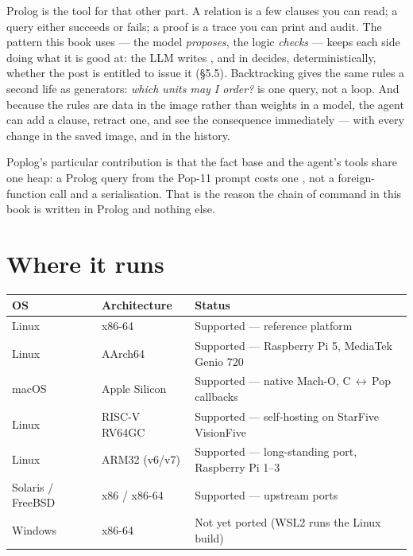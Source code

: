 Prolog is the tool for that other part. A relation is a few clauses you can
read; a query either succeeds or fails; a proof is a trace you can print and
audit. The pattern this book uses --- the model \emph{proposes}, the logic
\emph{checks} --- keeps each side doing what it is good at: the LLM writes
, and  in
 decides, deterministically, whether the post is entitled
to issue it (\S5.5). Backtracking gives the same rules a second life as
generators: \emph{which units may I order?} is one query, not a loop. And
because the rules are data in the image rather than weights in a model, the
agent can add a clause, retract one, and see the consequence immediately ---
with every change in the saved image, and in the history.

Poplog's particular contribution is that the fact base and the agent's tools
share one heap: a Prolog query from the Pop-11 prompt costs one ,
not a foreign-function call and a serialisation. That is the reason the
chain of command in this book is written in Prolog and nothing else.


\section{Where it runs}

\begin{center}
\footnotesize
\begin{tabular}{llp{6.6cm}}
\toprule
\textbf{OS} & \textbf{Architecture} & \textbf{Status}\\
\midrule
Linux   & x86-64          & Supported --- reference platform\\
Linux   & AArch64         & Supported --- Raspberry Pi 5, MediaTek Genio 720\\
macOS   & Apple Silicon   & Supported --- native Mach-O, C\,$\leftrightarrow$\,Pop callbacks\\
Linux   & RISC-V RV64GC   & Supported --- self-hosting on StarFive VisionFive\\
Linux   & ARM32 (v6/v7)   & Supported --- long-standing port, Raspberry Pi 1--3\\
Solaris / FreeBSD & x86 / x86-64 & Supported --- upstream ports\\
Windows & x86-64          & Not yet ported (WSL2 runs the Linux build)\\
\bottomrule
\end{tabular}
\end{center}

